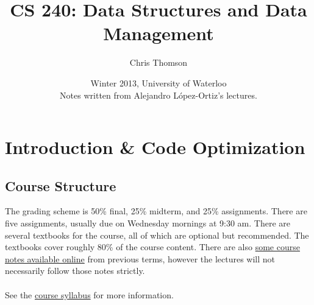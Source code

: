 \documentclass[]{article}
\theoremstyle{definition}
\newcommand{\lecture}[1]{\marginpar{{\footnotesize $\leftarrow$ \underline{#1}}}}
\begin{document}
	\let\ref\Cref

	\title{\bf{CS 240: Data Structures and Data Management}}
	\date{Winter 2013, University of Waterloo \\ \center Notes written from Alejandro L\'opez-Ortiz's lectures.}
	\author{Chris Thomson}
	\maketitle
	\newpage
	\tableofcontents
	\newpage

	\section{Introduction \& Code Optimization} \lecture{January 8, 2013}
		\subsection{Course Structure}
			The grading scheme is 50\% final, 25\% midterm, and 25\% assignments. There are five assignments, usually due on Wednesday mornings at 9:30 am. There are several textbooks for the course, all of which are optional but recommended. The textbooks cover roughly 80\% of the course content. There are also \href{https://www.student.cs.uwaterloo.ca/~cs240/w13/lectures.phtml}{some course notes available online} from previous terms, however the lectures will not necessarily follow those notes strictly.
			\\ \\
			See the \href{https://www.student.cs.uwaterloo.ca/~cs240/w13/info.phtml}{course syllabus} for more information.
			
\end{document}
